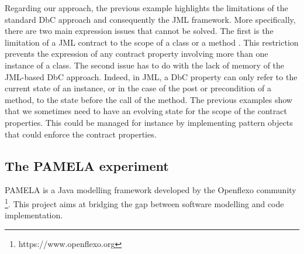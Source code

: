 Regarding our approach, the previous example highlights the limitations of the standard DbC approach and consequently the JML framework. More specifically, there are two main expression issues that cannot be solved. The first is the limitation of a JML contract to the scope of a class or a method . This restriction prevents the expression of any contract property involving more than one instance of a class. The second issue has to do with the lack of memory of the JML-based DbC approach. Indeed, in JML, a DbC property can only refer to the current state of an instance, or in the case of the post or precondition of a method, to the state before the call of the method. The previous examples show that we sometimes need to have an evolving state for the scope of the contract properties. This could be managed for instance by implementing pattern objects that could enforce the contract properties. 

\subsection{The PAMELA experiment}


PAMELA is a Java modelling framework developed by the Openflexo community \footnote{https://www.openflexo.org}. This project aims at bridging the gap between software modelling and code implementation. 

